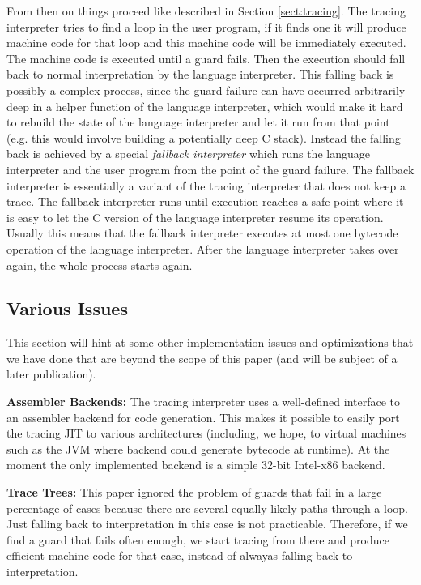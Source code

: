 \documentclass{acm_proc_article-sp}
\begin{document}
From then on things proceed like described in Section \ref{sect:tracing}. The
tracing interpreter tries to find a loop in the user program, if it finds one it
will produce machine code for that loop and this machine code will be
immediately executed. The machine code is executed until a guard fails. Then the
execution should fall back to normal interpretation by the language interpreter.
This falling back is possibly a complex process, since the guard failure can
have occurred arbitrarily deep in a helper function of the language interpreter,
which would make it hard to rebuild the state of the language interpreter and
let it run from that point (e.g. this would involve building a potentially deep
C stack). Instead the falling back is achieved by a special \emph{fallback
interpreter} which runs the language interpreter and the user program from the
point of the guard failure. The fallback interpreter is essentially a variant of
the tracing interpreter that does not keep a trace. The fallback interpreter
runs until execution reaches a safe point where it is easy to let the C version
of the language interpreter resume its operation. Usually this means that the
fallback interpreter executes at most one bytecode operation of the language
interpreter. After the language interpreter takes over again, the whole process
starts again.

\subsection{Various Issues}

This section will hint at some other implementation issues and optimizations
that we have done that are beyond the scope of this paper (and will be subject
of a later publication).

\textbf{Assembler Backends:} The tracing interpreter uses a well-defined
interface to an assembler backend for code generation. This makes it possible to
easily port the tracing JIT to various architectures (including, we hope, to
virtual machines such as the JVM where backend could generate bytecode at
runtime). At the moment the only implemented backend is a simple 32-bit
Intel-x86 backend.

\textbf{Trace Trees:} This paper ignored the problem of guards that fail in a
large percentage of cases because there are several equally likely paths through
a loop. Just falling back to interpretation in this case is not practicable.
Therefore, if we find a guard that fails often enough, we start tracing from
there and produce efficient machine code for that case, instead of alwayas
falling back to interpretation.
\end{document}
